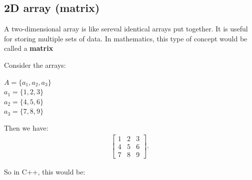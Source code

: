 \documentclass{report}
\begin{document}
    \subsection{2D array (matrix)}
    \bigbreak \noindent 
    \begin{concept}
 A two-dimensional array is like sereval identical arrays put together. It is useful for storing multiple sets of data. In mathematics, this type of concept would be called a \textbf{matrix}
	\end{concept}
    \bigbreak \noindent 
    \begin{minipage}[]{0.47\textwidth}
    Consider the arrays:
    \begin{center}
        $A = \{a_{1}, a_{2}, a_{3}\} $ \\
        $a_{1} = \{1,2,3\} $ \\
        $a_{2} = \{4,5,6\} $ \\
        $a_{3} = \{7,8,9\} $ \\
    \end{center}
    \end{minipage}
    \begin{minipage}[]{0.47\textwidth}
    Then we have:
    \begin{align*}
        \begin{bmatrix}
            1 & 2 & 3 \\
            4 & 5 & 6 \\
            7 & 8 & 9
        \end{bmatrix}
    .\end{align*}
    \end{minipage}
    \bigbreak \noindent 
    So in C++, this would be:
    \bigbreak \noindent 
    
\end{document}
